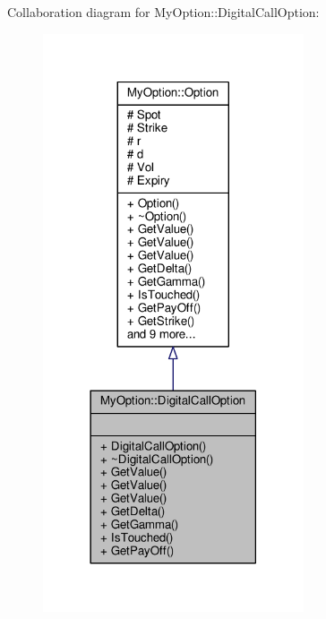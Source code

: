 Collaboration diagram for My\+Option\+:\+:Digital\+Call\+Option\+:
\nopagebreak
\begin{figure}[H]
\begin{center}
\leavevmode
\includegraphics[width=218pt]{classMyOption_1_1DigitalCallOption__coll__graph}
\end{center}
\end{figure}
